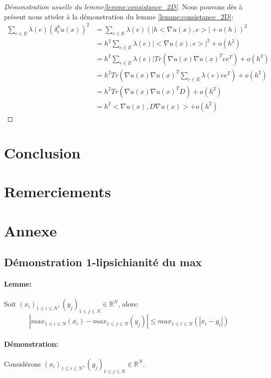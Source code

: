 \documentclass[12pt]{article}
\def\bR{\mathbb{R}}
\numberwithin{equation}{section}
\begin{document}
\begin{proof}[Démonstration usuelle du lemme\ref{lemme:consistance_2D}]
Nous pouvons dès à présent nous atteler à la démonstration du lemme \ref{lemme:consistance_2D}:
\begin{equation}
    \begin{split}
        \sum_{e \in E}\lambda(e)(\delta_e^hu(x))^2 & =\sum_{e \in E}\lambda(e)(|h<\nabla u(x),e>|+o(h))^2\\
        & = h^2\sum_{e \in E}\lambda(e)|<\nabla u(x),e>|^2+o(h^2)\\
        & = h^2\sum_{e \in E}\lambda(e)|Tr(\nabla u(x)\nabla u(x)^T ee^T)+o(h^2)\\
        &  = h^2Tr(\nabla u(x)\nabla u(x)^T\sum_{e \in E}\lambda(e)ee^T)+o(h^2)\\
        & = h^2Tr(\nabla u(x)\nabla u(x)^T D)+o(h^2)\\
        & = h^2<\nabla u(x), D\nabla u(x)>+o(h^2)
    \end{split}
\end{equation}
\end{proof}



\section{Conclusion}
\section{Remerciements}
\section{Annexe}
\subsection{Démonstration 1-lipsichianité du max}
\paragraph{Lemme:} Soit $(x_i)_{1\le i\le N},(y_j)_{1\le j\le N}\in \bR^N$, alors:
\begin{equation}
    |max_{1\le i\le N}(x_i)-max_{1\le j\le N}(y_j)|\le max_{1\le i\le N}(|x_i-y_i|)
\end{equation}
\paragraph{Démonstration:}
Considérons $(x_i)_{1\le i\le N},(y_j)_{1\le j\le N}\in \bR^N$.
\end{document}
